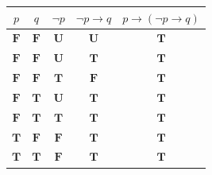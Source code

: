 \documentclass[12pt]{article}
\begin{document}
{\begin{longtable}[]{@{}ccccc@{}}
\toprule
\(p\) & \(q\) & \(\neg p\) & \(\neg p \to q\) &
\(p \to (\neg p \to q)\)\tabularnewline
\midrule
\endhead
\(\textbf{F}\) & \(\textbf{F}\) & \(\textbf{U}\) & \(\textbf{U}\) &
\(\textbf{T}\)\tabularnewline
\(\textbf{F}\) & \(\textbf{F}\) & \(\textbf{U}\) & \(\textbf{T}\) &
\(\textbf{T}\)\tabularnewline
\(\textbf{F}\) & \(\textbf{F}\) & \(\textbf{T}\) & \(\textbf{F}\) &
\(\textbf{T}\)\tabularnewline
\(\textbf{F}\) & \(\textbf{T}\) & \(\textbf{U}\) & \(\textbf{T}\) &
\(\textbf{T}\)\tabularnewline
\(\textbf{F}\) & \(\textbf{T}\) & \(\textbf{T}\) & \(\textbf{T}\) &
\(\textbf{T}\)\tabularnewline
\(\textbf{T}\) & \(\textbf{F}\) & \(\textbf{F}\) & \(\textbf{T}\) &
\(\textbf{T}\)\tabularnewline
\(\textbf{T}\) & \(\textbf{T}\) & \(\textbf{F}\) & \(\textbf{T}\) &
\(\textbf{T}\)\tabularnewline
\bottomrule
\end{longtable}

}
\end{document}
